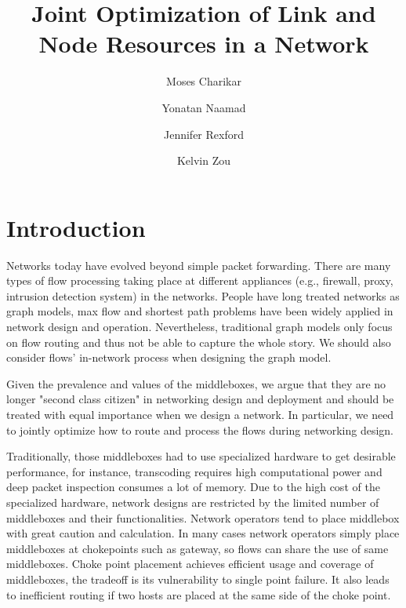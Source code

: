 \documentclass[twocolumn]{article}
\begin{document}
\title{Joint Optimization of Link and Node Resources in a Network}


\author[*]{Moses Charikar}
\author[*]{Yonatan Naamad}
\author[*]{Jennifer Rexford}
\author[*]{Kelvin Zou}


\date{}

\maketitle


\section{Introduction}

Networks today have evolved beyond simple packet forwarding. There are many types of flow processing taking place at different appliances (e.g., firewall, proxy, intrusion detection system) in the networks. People have long treated networks as graph models, max flow and shortest path problems \cite{FordFulkerson, Edmonds1972} have been widely applied in network design and operation. Nevertheless, traditional graph models only focus on flow routing and thus not be able to capture the whole story. We should also consider flows' in-network process when designing the graph model. 

Given the prevalence and values of the middleboxes, we argue that they are no longer "second class citizen" in networking design and deployment and should be treated with equal importance when we design a network. In particular, we need to jointly optimize how to route and process the flows during networking design.

Traditionally, those middleboxes had to use specialized hardware to get desirable performance, for instance, transcoding requires high computational power and deep packet inspection consumes a lot of memory. Due to the high cost of the specialized hardware, network designs are restricted by the limited number of middleboxes and their functionalities. Network operators tend to place middlebox with great caution and calculation. In many cases network operators simply place middleboxes at chokepoints such as gateway, so flows can share the use of same middleboxes. Choke point placement achieves efficient usage and coverage of middleboxes, the tradeoff is its vulnerability to single point failure. It also leads to inefficient routing if two hosts are placed at the same side of the choke point. 
\end{document}
